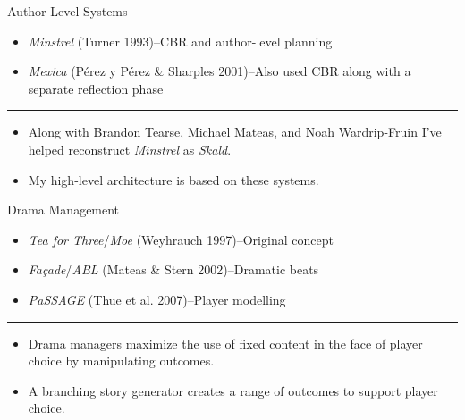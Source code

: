 \documentclass[xcolor=x11names]{beamer}
\newcommand{\work}[1]{\textit{#1}\xspace}
\begin{document}
\begin{frame}{Author-Level Systems}
  \begin{itemize}
    \item \work{Minstrel} (Turner 1993)--CBR and author-level planning
    \item \work{Mexica} (P\'erez y P\'erez \& Sharples 2001)--Also used CBR along with a separate reflection phase
  \end{itemize}
  \hrule
  \begin{itemize}
    \item Along with Brandon Tearse, Michael Mateas, and Noah Wardrip-Fruin I've helped reconstruct \work{Minstrel} as \work{Skald}.
    \item My high-level architecture is based on these systems.
  \end{itemize}
\end{frame}


\begin{frame}{Drama Management}
  \begin{itemize}
    \item \work{Tea for Three}/\work{Moe} (Weyhrauch 1997)--Original concept
    \item \work{Fa\c{c}ade}/\work{ABL} (Mateas \& Stern 2002)--Dramatic beats
    \item \work{PaSSAGE} (Thue et al. 2007)--Player modelling
  \end{itemize}
  \hrule
  \begin{itemize}
    \item Drama managers maximize the use of fixed content in the face of player choice by manipulating outcomes.
    \item A branching story generator creates a range of outcomes to support player choice.
  \end{itemize}
\end{frame}
\end{document}
